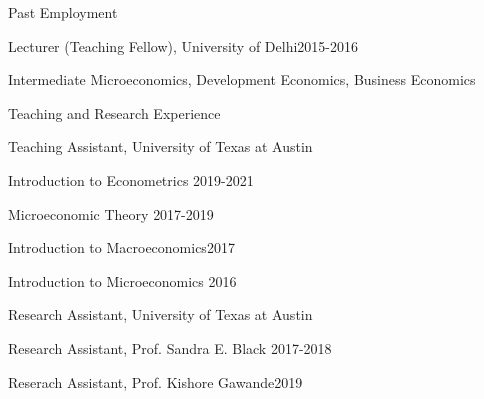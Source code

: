 \documentclass{resume} %
\begin{document}
\begin{rSection}{Past Employment} \itemsep -2pt
\begin{rSubsection}{Lecturer (Teaching Fellow), University of Delhi}{2015-2016}{}{}
\item[] \quad Intermediate Microeconomics, Development Economics, Business Economics
\end{rSubsection}
\end{rSection}


\begin{rSection}{Teaching and Research Experience} \itemsep -2pt
\begin{rSubsection}{Teaching Assistant, University of Texas at Austin}{}{}{}
\item[] \quad Introduction to Econometrics \hfill{2019-2021}
\item[] \quad Microeconomic Theory \hfill{2017-2019}
\item[] \quad Introduction to Macroeconomics\hfill{2017}
\item[] \quad Introduction to Microeconomics \hfill{2016}
\end{rSubsection}

\begin{rSubsection}{Research Assistant, University of Texas at Austin}{}{}{}
\item[] \quad Research Assistant, Prof. Sandra E. Black \hfill{2017-2018}
\item[] \quad Reserach Assistant, Prof. Kishore Gawande\hfill{2019}
\end{rSubsection}
\end{rSection}
\end{document}
